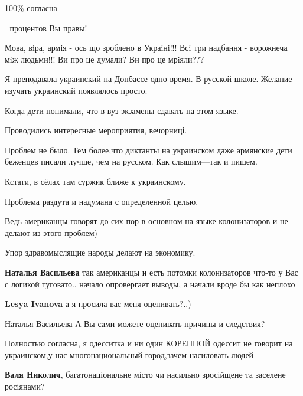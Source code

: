 \begin{itemize}
\begin{itemize}
\end{itemize}

100\% согласна

💯 процентов Вы правы!


Мова, вiра, армiя - ось що зроблено в Украiнi!!! Всi три надбання - ворожнеча мiж
людьми!!! Ви про це думали? Ви про це мрiяли???


Я преподавала украинский на Донбассе одно время. В русской школе. Желание изучать
украинский появлялось просто.

Когда дети понимали, что в вуз экзамены сдавать на этом языке.

Проводились интересные мероприятия, вечорниці.

Проблем не было. Тем более,что диктанты на украинском даже армянские дети
беженцев писали лучше, чем на русском. Как слышим—так и пишем.

Кстати, в сёлах там суржик ближе к украинскому.

Проблема раздута и надумана с определенной целью.

Ведь американцы говорят до сих пор в основном на языке колонизаторов и не
делают из этого проблем)

Упор здравомыслящие народы делают на экономику.

\begin{itemize}

\textbf{Наталья Васильева} так американцы и есть потомки колонизаторов что-то у
Вас с логикой туговато.. начало опровергает выводы, а начали
вроде бы как неплохо

\textbf{Lesya Ivanova} а я просила вас меня оценивать?..)

Наталья Васильева А Вы сами можете оценивать причины и следствия?

\end{itemize}

Полностью согласна, я одесситка и ни один КОРЕННОЙ одессит не говорит на
украинском,у нас многонациональный город,зачем насиловать людей

\begin{itemize}

\textbf{Валя Николич}, багатонаціональне місто чи насильно зросійщене та заселене росіянами?


\end{itemize}
\end{itemize}

